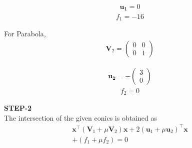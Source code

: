 \documentclass[10pt,a4paper]{report}
\newcommand{\myvec}[1]{\ensuremath{\begin{pmatrix}#1\end{pmatrix}}}
\let\vec\mathbf
\let\vec\mathbf
\providecommand{\brak}[1]{\ensuremath{\left(#1\right)}}
\begin{document}
\begin{multicols}{2}
\begin{align}
\vec{u_1}=0
\end{align} 
\begin{align}
f_1=-16
\end{align} \vspace{2mm}

For Parabola,\\\vspace{1mm}
\begin{align}
\vec{V}_2=\myvec{
0 & 0\\
0 & 1
}
\end{align} 

\begin{align}
\vec{u_2}= -\myvec{
3\\
0
}
\end{align} 
\begin{align}
f_2=0
\end{align} \vspace{2mm}

\textbf{STEP-2}\vspace{2mm}\\
The intersection of the given conics is obtained
as\\
\begin{align}
	\vec{x}^{\top}\brak{\vec{V}_1 + \mu\vec{V}_2}\vec{x}+2 \brak{\vec{u}_1+\mu \vec{u}_2}^{\top} \vec{x} 
	\\
	+ \brak{f_1+\mu f_2}= 0
    \end{align}
    

\end{multicols}
\end{document}

